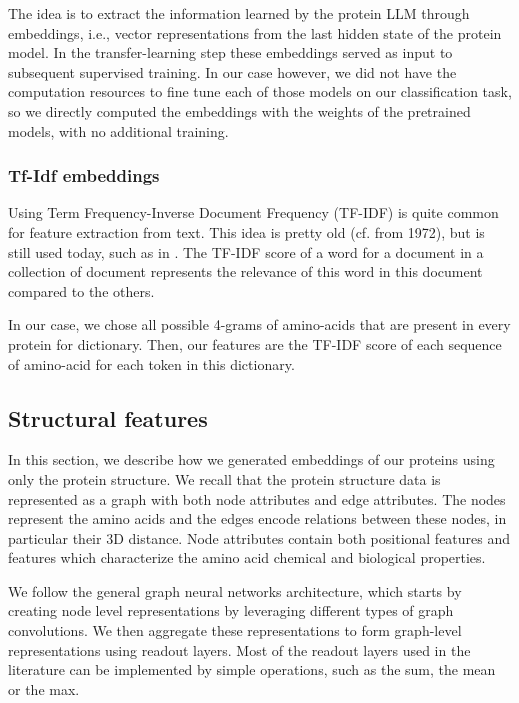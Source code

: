 \documentclass[final]{cvpr}
\begin{document}
The idea is to extract the information learned by the protein LLM through embeddings, i.e., vector representations from the last hidden state of the protein model. In the transfer-learning step these embeddings served as input to subsequent supervised training. In our case however, we did not have the computation resources to fine tune each of those models on our classification task, so we directly computed the embeddings with the weights of the pretrained models, with no additional training.

\subsubsection{Tf-Idf embeddings}

Using Term Frequency-Inverse Document Frequency (TF-IDF) is quite common for feature extraction from text. This idea is pretty old (cf. \cite{SPARCKJONES1972} from 1972), but is still used today, such as in \cite{TFIDF}. The TF-IDF score of a word for a document in a collection of document represents the relevance of this word in this document compared to the others.

In our case, we chose all possible 4-grams of amino-acids that are present in every protein for dictionary. Then, our features are the TF-IDF score of each sequence of amino-acid for each token in this dictionary. 

\subsection{Structural features} \label{sec:structuralFeatures}

In this section, we describe how we generated embeddings of our proteins using only the protein structure. We recall that the protein structure data is represented as a graph with both node attributes and edge attributes. The nodes represent the amino acids and the edges encode relations between these nodes, in particular their 3D distance. Node attributes contain both positional features and features which characterize the amino acid chemical and biological properties.

We follow the general graph neural networks architecture, which starts by creating node level representations by leveraging different types of graph convolutions. We then aggregate these representations to form graph-level representations using readout layers. Most of the readout layers used in the literature can be implemented by simple operations, such as the sum, the mean or the max. 
\end{document}
